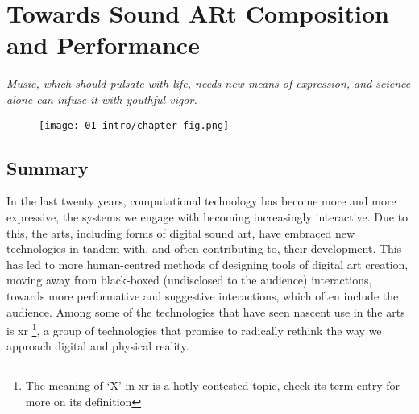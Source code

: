 \chapter{Towards Sound ARt Composition and Performance}
\label{sec: introduction}
\epigraph{\emph{Music, which should pulsate with life, needs new means of expression, and science alone can infuse it with youthful vigor.}}{\citep{varese1966}}

\begin{figure}
    \centering
    \texttt{[image: 01-intro/chapter-fig.png]}
    \captionsetup{labelformat=empty}
    \caption[\autoref*{sec: introduction}'s page-figure: \textit{polygons\textasciitilde{}} in performance at the Attenborough Centre for Creative Arts, University of Sussex, on June 8th, (from \citeauthor{bilbow2022a}, \citeyear{bilbow2022a})]{}
\end{figure}

\clearpage
\section{Summary}\label{sec: introduction-summary}

In the last twenty years, computational technology has become more and more expressive, the systems we engage with becoming increasingly interactive. Due to this, the arts, including forms of digital sound art, have embraced new technologies in tandem with, and often contributing to, their development. This has led to more human-centred methods of designing tools of digital art creation, moving away from black-boxed (undisclosed to the audience) interactions, towards more performative and suggestive interactions, which often include the audience. Among some of the technologies that have seen nascent use in the arts is \gls{xr} \footnote{The meaning of `X' in \gls{xr} is a hotly contested topic, check its term entry for more on its definition}, a group of technologies that promise to radically rethink the way we approach digital and physical reality. 

